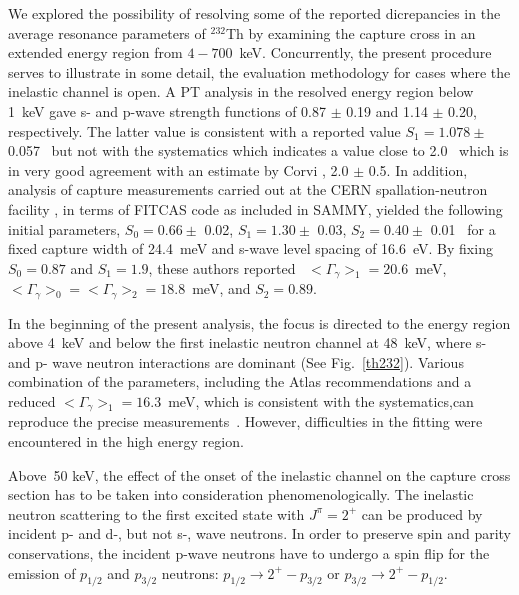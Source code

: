 \documentclass[twocolumn,amsmath,amssymb,10pt,groupedaddress,a4paper]{revtex4}
\begin{document}
We explored  the possibility of resolving some of the reported dicrepancies in the  average resonance parameters of $^{232}$Th by examining the capture cross  in an extended energy region from $4-700$~keV. Concurrently, the present procedure serves to illustrate in some detail, the evaluation methodology for cases where the inelastic channel is open. A PT analysis in the resolved energy region below 1~keV gave  s-  and  p-wave strength functions of 0.87 $\pm$ 0.19 and 1.14 $\pm$ 0.20, respectively. The latter value is consistent with a reported value $S_1 = 1.078 \pm$ 0.057~\cite{Macklin:77} but not with the systematics which indicates a value close to 2.0~\cite{Mughabghab:79} which is in very good agreement with an estimate by Corvi \cite{Corvi:78}, 2.0 $\pm$ 0.5. In addition, analysis of capture measurements carried out at the CERN spallation-neutron facility , in terms of FITCAS code  as included in SAMMY, yielded the following initial parameters, $S_0= 0.66 \pm$ 0.02, $S_1= 1.30 \pm$ 0.03, $S_2= 0.40 \pm$ 0.01~\cite{aerts:054610} for a fixed capture width of 24.4~meV and s-wave level spacing of 16.6~eV. By fixing $S_0=0.87$ and $S_1 =1.9$, these authors reported~\cite{aerts:054610} $<\Gamma_\gamma>_1=20.6$~meV,  $<\Gamma_\gamma>_0 =<\Gamma_\gamma>_2 =18.8$~meV, and $S_2=0.89$.

In the beginning of the present analysis, the focus is directed to the energy region above 4~keV and  below the first inelastic neutron channel at 48~keV, where s- and p- wave neutron interactions are dominant (See Fig.~\ref{th232}). Various combination of the parameters, including the Atlas recommendations and  a reduced $<\Gamma_\gamma>_1 = 16.3$~meV, which is  consistent with the systematics,can reproduce the  precise measurements~\cite{aerts:054610}. However, difficulties in the fitting were encountered in the high energy region.

Above~50 keV, the effect of the onset of the inelastic channel on the capture cross section has to be taken into consideration phenomenologically. The inelastic neutron scattering  to the first excited state with $J^{\pi}=2^+$ can be produced by  incident p- and d-, but not s-, wave neutrons. In order to preserve spin and parity conservations, the  incident p-wave neutrons have to undergo a spin flip for the emission of $p_{1/2}$ and $p_{3/2}$ neutrons: $p_{1/2}\rightarrow2^{+} - p_{3/2}$ or $p_{3/2}\rightarrow2^{+}- p_{1/2}$.
\end{document}
